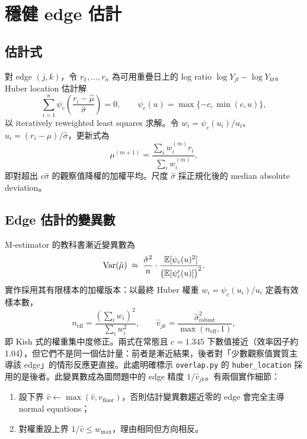 \documentclass[12pt,a4paper,oneside]{article}
\begin{document}
\section{穩健 edge 估計}

\subsection{估計式}

對 edge $(j,k)$，令 $r_1,\dots,r_n$ 為可用重疊日上的 log ratio
$\log Y_{jt}-\log Y_{kt}$。Huber location 估計解
\begin{equation}
\sum_{i=1}^{n}\psi_c\!\left(\frac{r_i-\hat{\mu}}{\hat{\sigma}}\right)=0,
\qquad
\psi_c(u)=\max\{-c,\min(c,u)\},
\end{equation}
以 iteratively reweighted least squares 求解。令
$w_i=\psi_c(u_i)/u_i$、$u_i=(r_i-\mu)/\hat{\sigma}$，更新式為
\begin{equation}
\mu^{(m+1)}=\frac{\sum_i w_i^{(m)} r_i}{\sum_i w_i^{(m)}},
\end{equation}
即對超出 $c\hat\sigma$ 的觀察值降權的加權平均。尺度 $\hat{\sigma}$ 採正規化後的 median absolute deviation。

\subsection{Edge 估計的變異數}

M-estimator 的教科書漸近變異數為
\begin{equation}
\operatorname{Var}(\hat{\mu}) \;\approx\;
\frac{\hat{\sigma}^2}{n}\cdot
\frac{\mathbb{E}[\psi_c(u)^2]}{\big(\mathbb{E}[\psi_c'(u)]\big)^2}.
\end{equation}
實作採用其有限樣本的加權版本：以最終 Huber 權重 $w_i=\psi_c(u_i)/u_i$ 定義有效樣本數，
\begin{equation}
n_{\text{eff}}=\frac{\left(\sum_i w_i\right)^2}{\sum_i w_i^2},
\qquad
\hat{v}_{jk}=\frac{\hat{\sigma}^2_{\text{robust}}}{\max(n_{\text{eff}},1)},
\end{equation}
即 Kish 式的權重集中度修正。兩式在常態且 $c=1.345$ 下數值接近（效率因子約 1.04），但它們不是同一個估計量：前者是漸近結果，後者對「少數觀察值實質主導該 edge」的情形反應更直接。此處明確標示 \texttt{overlap.py} 的 \texttt{huber\_location} 採用的是後者。此變異數成為圖問題中的 edge 精度 $1/\hat{v}_{jk}$。有兩個實作細節：
\begin{enumerate}
\item 設下界 $\hat{v}\leftarrow\max(\hat{v},v_{\text{floor}})$，否則估計變異數趨近零的 edge 會完全主導 normal equations；
\item 對權重設上界 $1/\hat{v}\le w_{\max}$，理由相同但方向相反。
\end{enumerate}
\end{document}
